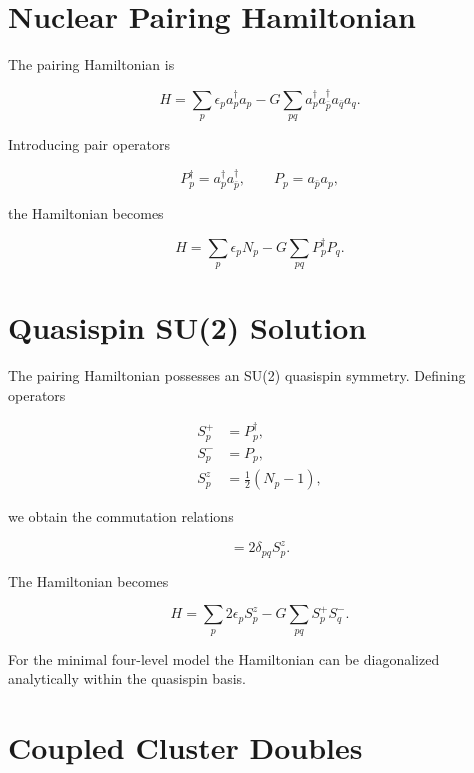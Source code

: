 \documentclass[twocolumn,superscriptaddress,unsortedaddress,nofootinbib,amsmath,amssymb,
aps,floatfix]{revtex4-2}
\begin{document}
\section{Nuclear Pairing Hamiltonian}

The pairing Hamiltonian is

\begin{equation}
H =
\sum_p \epsilon_p a_p^\dagger a_p
-
G
\sum_{pq}
a_p^\dagger a_{\bar p}^\dagger
a_{\bar q} a_q .
\end{equation}

Introducing pair operators

\begin{equation}
P_p^\dagger = a_p^\dagger a_{\bar p}^\dagger,
\qquad
P_p = a_{\bar p} a_p ,
\end{equation}

the Hamiltonian becomes

\begin{equation}
H =
\sum_p \epsilon_p N_p
-
G \sum_{pq} P_p^\dagger P_q .
\end{equation}

\section{Quasispin SU(2) Solution}

The pairing Hamiltonian possesses an SU(2) quasispin symmetry.
Defining operators

\begin{align}
S_p^+ &= P_p^\dagger, \\
S_p^- &= P_p, \\
S_p^z &= \frac{1}{2}(N_p-1),
\end{align}

we obtain the commutation relations

\begin{equation}
[S_p^+,S_q^-] = 2\delta_{pq}S_p^z .
\end{equation}

The Hamiltonian becomes

\begin{equation}
H =
\sum_p 2\epsilon_p S_p^z
-
G\sum_{pq}S_p^+ S_q^- .
\end{equation}

For the minimal four-level model the Hamiltonian can be diagonalized
analytically within the quasispin basis.

\section{Coupled Cluster Doubles}
\end{document}
